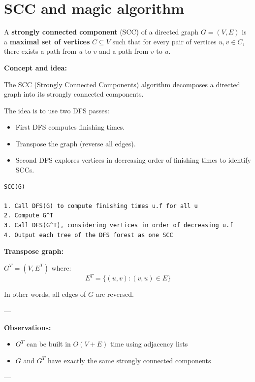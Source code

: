 \documentclass[11pt,a4paper,openany]{book}
\begin{document}
\section{SCC and magic algorithm}




\begin{defnbox}[title=Strongly Connected Component (SCC)]
A \textbf{strongly connected component} (SCC) of a directed graph $G = (V, E)$ is a \textbf{maximal set of vertices} $C \subseteq V$ such that for every pair of vertices $u, v \in C$, there exists a path from $u$ to $v$ and a path from $v$ to $u$.
\end{defnbox}



\textbf{Concept and idea:}

The SCC (Strongly Connected Components) algorithm decomposes a directed graph into its strongly connected components.

The idea is to use two DFS passes:
\begin{itemize}
    \item First DFS computes finishing times.
    \item Transpose the graph (reverse all edges).
    \item Second DFS explores vertices in decreasing order of finishing times to identify SCCs.
\end{itemize}

\begin{lstlisting}
SCC(G)

1. Call DFS(G) to compute finishing times u.f for all u
2. Compute G^T
3. Call DFS(G^T), considering vertices in order of decreasing u.f
4. Output each tree of the DFS forest as one SCC
\end{lstlisting}

\textbf{Transpose graph:}

$G^T = (V, E^T)$ where:
\[
E^T = \{(u,v) : (v,u) \in E\}
\]

In other words, all edges of $G$ are reversed.

---

\textbf{Observations:}
\begin{itemize}
    \item $G^T$ can be built in $O(V + E)$ time using adjacency lists
    \item $G$ and $G^T$ have exactly the same strongly connected components
\end{itemize}

---
\end{document}
